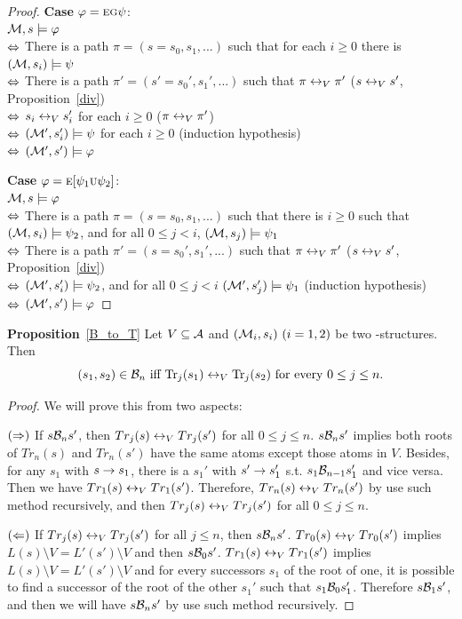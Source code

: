 \documentclass{article}
\begin{document}
\begin{proof}
\textbf{Case} $\varphi = \textsc{e} \textsc{g} \psi$:\\
${\cal M}, s \models \varphi$ \\
$\Leftrightarrow$ There is a path $\pi =(s=s_0, s_1, ...)$ such that for each $i \geq 0$ there is $({\cal M}, s_i) \models \psi$\\
$\Leftrightarrow$ There is a path $\pi' = (s'=s_0', s_1', ...)$ such that $\pi \leftrightarrow_V \pi'$   \hfill ($s \leftrightarrow_V s'$, Proposition~\ref{div})\\
$\Leftrightarrow$ $s_i \leftrightarrow_V s_i'$ for each $i \geq 0$ \hfill ($\pi \leftrightarrow_V \pi'$)\\
$\Leftrightarrow$ $({\cal M}', s_i') \models \psi$ for each $i \geq 0$  \hfill  (induction hypothesis)\\
$\Leftrightarrow$ $({\cal M}', s') \models \varphi$

\textbf{Case} $\varphi = \textsc{e} [\psi_1 \textsc{u} \psi_2]$:\\
${\cal M}, s \models \varphi$ \\
$\Leftrightarrow$ There is a path $\pi= (s=s_0, s_1, ...)$ such that there is $i \geq 0$ such that $({\cal M}, s_i) \models \psi_2$, and for all $0 \leq j < i$, $({\cal M}, s_j) \models \psi_1$\\
$\Leftrightarrow$ There is a path $\pi' = (s=s_0', s_1', ...)$ such that $\pi \leftrightarrow_V \pi'$  \hfill  ($s \leftrightarrow_V s'$, Proposition~\ref{div})\\
$\Leftrightarrow$ $({\cal M}', s_i') \models \psi_2$, and for all $0 \leq j < i$ $({\cal M}', s_j') \models \psi_1$   \hfill   (induction hypothesis)\\
$\Leftrightarrow$ $({\cal M}', s') \models \varphi$
\end{proof}


\textbf{Proposition}~\ref{B_to_T}  Let $V\subseteq\cal A$ and $({\cal M}_i,s_i)~(i=1,2)$ be two \MPK-structures.
  Then
  \[(s_1,s_2)\in{\cal B}_n\mbox{ iff }
  \textrm{Tr}_j(s_1)\leftrightarrow_V\textrm{Tr}_j(s_2)\mbox{ for every $0\le j\le n$}.\]
\begin{proof}
We will prove this from two aspects:

$(\Rightarrow)$ If $s {\cal B}_n s'$, then $Tr_j(s) \leftrightarrow_V Tr_j(s')$ for all $0 \leq j \leq n$. $s {\cal B}_n s'$ implies both roots of $Tr_n(s)$ and $Tr_n(s')$ have the same atoms except those atoms in $V$.
Besides, for any $s_1$ with $s\rightarrow s_1$, there is a $s_1'$ with $s'\rightarrow s_1'$ s.t. $s_1 {\cal B}_{n-1} s_1'$ and vice versa.
Then we have $Tr_1(s) \leftrightarrow_V Tr_1(s')$.
Therefore,  $Tr_n(s) \leftrightarrow_V Tr_n(s')$ by use such method recursively, and then $Tr_j(s) \leftrightarrow_V Tr_j(s')$ for all $0 \leq j \leq n$.

$(\Leftarrow)$ If $Tr_j(s) \leftrightarrow_V Tr_j(s')$ for all $j \leq n$, then $s {\cal B}_n s'$.
$Tr_0(s) \leftrightarrow_V Tr_0(s')$ implies $L(s) \setminus V = L'(s') \setminus V$ and then $s {\cal B}_0 s'$.
$Tr_1(s) \leftrightarrow_V Tr_1(s')$ implies $L(s) \setminus V = L'(s')\setminus V$ and for every successors $s_1$ of the root of one, it is possible to find a successor of the root of the other $s_1'$ such that
$s_1 {\cal B}_0 s_1'$. Therefore $s {\cal B}_1 s'$, and then we will have $s {\cal B}_n s'$ by use such method recursively.
\end{proof}
\end{document}
